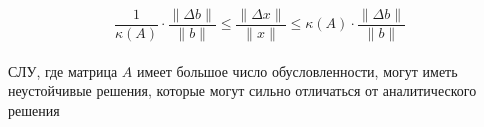 \[
\frac{1}{\kappa(A)} \cdot \frac{\lVert \Delta b \rVert}{\lVert b \rVert}
\leqslant
\frac{\lVert \Delta x \rVert}{\lVert x \rVert}
\leqslant
\kappa(A) \cdot \frac{\lVert \Delta b \rVert}{\lVert b \rVert}
\]
\\
СЛУ, где матрица $A$ имеет большое число обусловленности, могут иметь неустойчивые решения, которые могут сильно отличаться от аналитического решения
